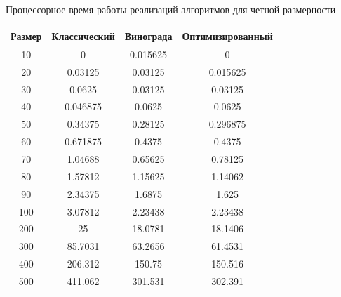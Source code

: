 \begin{center}
	\begin{threeparttable}
		\caption{Процессорное время работы реализаций алгоритмов для четной размерности}
		\label{tbl:best}
		\begin{tabular}{|c|c|c|c|}
			\hline
			Размер & Классический &  Винограда &  Оптимизированный\\
			\hline
			10 & 0  &  0.015625 &0  \\ 
			\hline
			20 &0.03125  &      0.03125 &      0.015625\\ 
			\hline
			30 &  0.0625        &0.03125  &      0.03125 \\ 
			\hline
			40 &  0.046875     &    0.0625 &        0.0625  \\ 
			\hline
			50 & 0.34375      &  0.28125    &   0.296875  \\ 
			\hline
			60 & 0.671875    &     0.4375    &     0.4375 \\ 
			\hline
			70 &  1.04688   &     0.65625     &   0.78125 \\ 
			\hline
			80 & 1.57812   &     1.15625       & 1.14062 \\ 
			\hline
			90 & 2.34375  &       1.6875        &  1.625 \\ 
			\hline
			100 & 3.07812&        2.23438        &2.23438 \\ 
			\hline
			200 & 25 &       18.0781      &  18.1406\\ 
			\hline
			300 &  85.7031    &    63.2656 &       61.4531 \\ 
			\hline
			400 &  206.312   &      150.75  &      150.516  \\ 
			\hline
			500 &  411.062  &      301.531   &     302.391  \\ 
			\hline
		\end{tabular}
		

\end{threeparttable}
\end{center}
